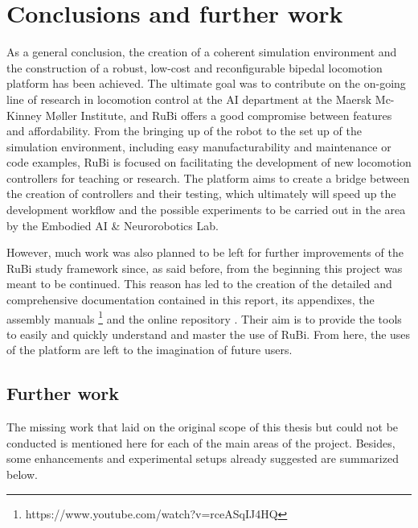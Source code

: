 \chapter{Conclusions and further work} %
\label{cha:conclusions}
As a general conclusion, the creation of a coherent simulation environment and the construction of a robust, low-cost and reconfigurable bipedal locomotion platform has been achieved.
The ultimate goal was to contribute on the on-going line of research in locomotion control at the AI department at the Maersk Mc-Kinney Møller Institute, and RuBi offers a good compromise between features and affordability.
From the bringing up of the robot to the set up of the simulation environment,  including easy manufacturability and maintenance or code examples, RuBi is focused on facilitating the development of new locomotion controllers for teaching or research.
The platform aims to create a bridge between the creation of controllers and their testing, which ultimately will speed up the development workflow and the possible experiments to be carried out in the area by the Embodied AI \& Neurorobotics Lab.

However, much work was also planned to be left for further improvements of the RuBi study framework since, as said before, from the beginning this project was meant to be continued.
This reason has led to the creation of the detailed and comprehensive documentation contained in this report, its appendixes, the assembly manuals \footnote{https://www.youtube.com/watch?v=rceASqIJ4HQ} and the online repository \cite{rubi_repo}.
Their aim is to provide the tools to easily and quickly understand and master the use of RuBi.
From here, the uses of the platform are left to the imagination of future users.

\section{Further work} %
\label{sec:further_work}
The missing work that laid on the original scope of this thesis but could not be conducted is mentioned here for each of the main areas of the project.
Besides, some enhancements and experimental setups already suggested are summarized below.

